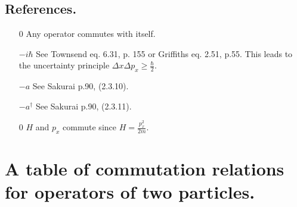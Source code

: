 \documentclass[12pt,letterpaper]{article}
\begin{document}
\subsection{References.}
\begin{itemize}
\item[0] \label{self} Any operator commutes with itself.
\item[$-i \hbar$] \label{unc} See Townsend eq. 6.31, p. 155 or Griffiths eq. 2.51, p.55. This leads to the uncertainty principle $\Delta x \Delta p_x \geq \frac{\hbar}{2}$.
\item[$-a$] \label{N-a} See Sakurai p.90, (2.3.10).
\item[$-a^\dagger$] \label{N-aDag} See Sakurai p.90, (2.3.11).
\item[0] \label{H-p_x} $H$ and $p_x$ commute since $H = \frac{p_x^2}{2m}$.
\end{itemize}

\section{A table of commutation relations for operators of two particles.}
\end{document}
